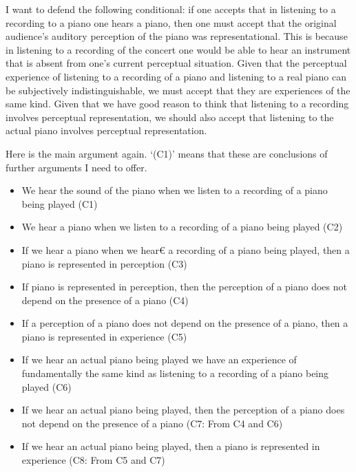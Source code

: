 \documentclass[sloppy, journal, git, bytitle, dodraft]{humapap}
\begin{document}
I want to defend the following conditional: if one accepts that in listening to a recording to a piano one hears a piano, then one must accept that the original audience’s auditory perception of the piano was representational. This is because in listening to a recording of the concert one would be able to hear an instrument that is absent from one’s current perceptual situation. Given that the perceptual experience of listening to a recording of a piano and listening to a real piano can be subjectively indistinguishable, we must accept that they are experiences of the same kind. Given that we have good reason to think that listening to a recording involves perceptual representation, we should also accept that listening to the actual piano involves perceptual representation. 

Here is the main argument again. `(C1)' means that these are conclusions of further arguments I need to offer.

\begin{itemize}
	\item We hear the sound of the piano when we listen to a recording of a piano being played (C1)
	\item We hear a piano when we listen to a recording of a piano being played (C2)
	\item If we hear a piano when we hear€ a recording of a piano being played, then a piano is represented in perception (C3)
	\item If piano is represented in perception, then the perception of a piano does not depend on the presence of a piano (C4) 
	\item If a perception of a piano does not depend on the presence of a piano, then a piano is represented in experience (C5)
	\item If we hear an actual piano being played we have an experience of fundamentally the same kind as listening to a recording of a piano being played (C6)
	\item If we hear an actual piano being played, then the perception of a piano does not depend on the presence of a piano (C7: From C4 and C6)
	\item If we hear an actual piano being played, then a piano is represented in experience (C8: From C5 and C7)
\end{itemize}

\printbibliography
\end{document}
